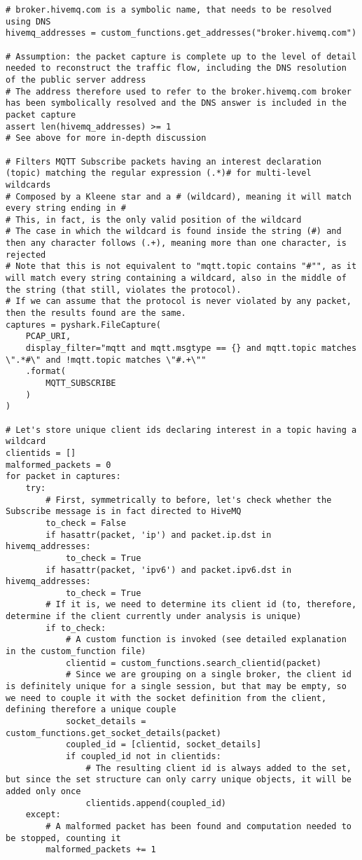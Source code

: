 \documentclass[a4paper,11pt]{article} %
\begin{document}
    \begin{verbatim}
# broker.hivemq.com is a symbolic name, that needs to be resolved using DNS
hivemq_addresses = custom_functions.get_addresses("broker.hivemq.com")

# Assumption: the packet capture is complete up to the level of detail needed to reconstruct the traffic flow, including the DNS resolution of the public server address
# The address therefore used to refer to the broker.hivemq.com broker has been symbolically resolved and the DNS answer is included in the packet capture
assert len(hivemq_addresses) >= 1
# See above for more in-depth discussion

# Filters MQTT Subscribe packets having an interest declaration (topic) matching the regular expression (.*)# for multi-level wildcards
# Composed by a Kleene star and a # (wildcard), meaning it will match every string ending in #
# This, in fact, is the only valid position of the wildcard
# The case in which the wildcard is found inside the string (#) and then any character follows (.+), meaning more than one character, is rejected
# Note that this is not equivalent to "mqtt.topic contains "#"", as it will match every string containing a wildcard, also in the middle of the string (that still, violates the protocol).
# If we can assume that the protocol is never violated by any packet, then the results found are the same.
captures = pyshark.FileCapture(
    PCAP_URI,
    display_filter="mqtt and mqtt.msgtype == {} and mqtt.topic matches \".*#\" and !mqtt.topic matches \"#.+\""
    .format(
        MQTT_SUBSCRIBE
    )
)

# Let's store unique client ids declaring interest in a topic having a wildcard
clientids = []
malformed_packets = 0
for packet in captures:
    try:
        # First, symmetrically to before, let's check whether the Subscribe message is in fact directed to HiveMQ
        to_check = False
        if hasattr(packet, 'ip') and packet.ip.dst in hivemq_addresses:
            to_check = True
        if hasattr(packet, 'ipv6') and packet.ipv6.dst in hivemq_addresses:
            to_check = True
        # If it is, we need to determine its client id (to, therefore, determine if the client currently under analysis is unique)
        if to_check:
            # A custom function is invoked (see detailed explanation in the custom_function file)
            clientid = custom_functions.search_clientid(packet)
            # Since we are grouping on a single broker, the client id is definitely unique for a single session, but that may be empty, so we need to couple it with the socket definition from the client, defining therefore a unique couple
            socket_details = custom_functions.get_socket_details(packet)
            coupled_id = [clientid, socket_details]
            if coupled_id not in clientids:
                # The resulting client id is always added to the set, but since the set structure can only carry unique objects, it will be added only once
                clientids.append(coupled_id)
    except:
        # A malformed packet has been found and computation needed to be stopped, counting it
        malformed_packets += 1


\end{verbatim}
\end{document}
